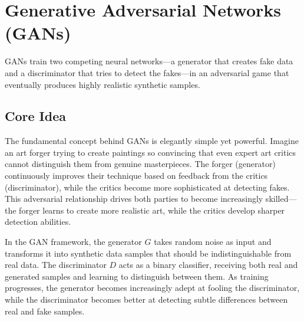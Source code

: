 
\section{Generative Adversarial Networks (GANs) }
\label{sec:gans}

GANs train two competing neural networks—a generator that creates fake data and a discriminator that tries to detect the fakes—in an adversarial game that eventually produces highly realistic synthetic samples.

\subsection{Core Idea}

The fundamental concept behind GANs is elegantly simple yet powerful. Imagine an art forger trying to create paintings so convincing that even expert art critics cannot distinguish them from genuine masterpieces. The forger (generator) continuously improves their technique based on feedback from the critics (discriminator), while the critics become more sophisticated at detecting fakes. This adversarial relationship drives both parties to become increasingly skilled—the forger learns to create more realistic art, while the critics develop sharper detection abilities.

In the GAN framework, the generator $G$ takes random noise as input and transforms it into synthetic data samples that should be indistinguishable from real data. The discriminator $D$ acts as a binary classifier, receiving both real and generated samples and learning to distinguish between them. As training progresses, the generator becomes increasingly adept at fooling the discriminator, while the discriminator becomes better at detecting subtle differences between real and fake samples.

